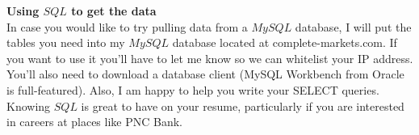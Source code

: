 \documentclass{article}
\begin{document}
{\bf Using $SQL$ to get the data}\\
In case you would like to try pulling data from a $MySQL$ database, I will put the tables you need into my $MySQL$ database located at complete-markets.com.  If you want to use it you'll have to let me know so we can whitelist your IP address.  You'll also need to download a database client (MySQL Workbench from Oracle is full-featured).  Also, I am happy to help you write your SELECT queries.  Knowing $SQL$ is great to have on your resume, particularly if you are interested in careers at places like PNC Bank. 
\end{document}
